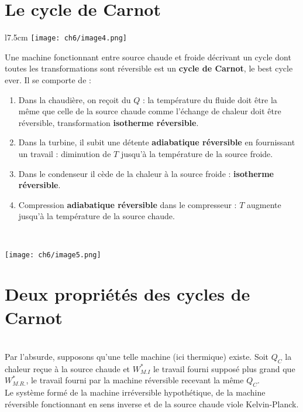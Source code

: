 	\section{Le cycle de Carnot}
	\begin{wrapfigure}[9]{l}{7.5cm}
	\vspace{5mm}
	\texttt{[image: ch6/image4.png]}
	\end{wrapfigure}
	Une machine fonctionnant entre source chaude et froide décrivant 
	un cycle dont toutes les transformations sont réversible est un 
	\textbf{cycle de Carnot}, le best cycle ever. Il se comporte de :
	\begin{enumerate}
	\item Dans la chaudière, on reçoit du $Q$ : la température du fluide 
	doit être la même que celle de la source chaude comme l'échange de chaleur
	doit être réversible, transformation \textbf{isotherme réversible}.
	\item Dans la turbine, il subit une détente \textbf{adiabatique réversible} 
	en fournissant un travail : diminution de $T$ jusqu'à la température 
	de la source froide.
	\item Dans le condenseur il cède de la chaleur à la source froide : 
	\textbf{isotherme réversible}.
	\item Compression \textbf{adiabatique réversible} dans le compresseur : $T$ 
	augmente jusqu'à la température de la source chaude.
	\end{enumerate}\ 
	\begin{center}
		\texttt{[image: ch6/image5.png]}
	\end{center}
	
	\section{Deux propriétés des cycles de Carnot}
	\ \\
	Par l'absurde, supposons qu'une telle machine (ici thermique) 
	existe. Soit $Q_C$ la chaleur reçue à la source chaude et $W_{M.I}^*$ 
	le travail fourni supposé plus grand que $W_{M.R.}^*$, le travail 
	fourni par la machine réversible recevant la même $Q_C$.\\
	Le système formé de la machine irréversible hypothétique, de la 
	machine réversible fonctionnant en sens inverse et de la source 
	chaude viole Kelvin-Planck.
	
